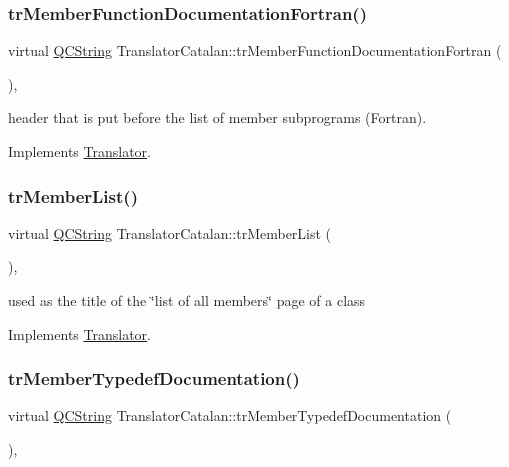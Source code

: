 \subsubsection{\texorpdfstring{trMemberFunctionDocumentationFortran()}{trMemberFunctionDocumentationFortran()}}
{\footnotesize\ttfamily virtual \mbox{\hyperlink{class_q_c_string}{Q\+C\+String}} Translator\+Catalan\+::tr\+Member\+Function\+Documentation\+Fortran (\begin{DoxyParamCaption}{ }\end{DoxyParamCaption})\hspace{0.3cm}{\ttfamily [inline]}, {\ttfamily [virtual]}}

header that is put before the list of member subprograms (Fortran). 

Implements \mbox{\hyperlink{class_translator}{Translator}}.

\mbox{\label{class_translator_catalan_a4f8c7c640d67b7a48c5c8532fb3a5a3e}} 
\subsubsection{\texorpdfstring{trMemberList()}{trMemberList()}}
{\footnotesize\ttfamily virtual \mbox{\hyperlink{class_q_c_string}{Q\+C\+String}} Translator\+Catalan\+::tr\+Member\+List (\begin{DoxyParamCaption}{ }\end{DoxyParamCaption})\hspace{0.3cm}{\ttfamily [inline]}, {\ttfamily [virtual]}}

used as the title of the \char`\"{}list of all members\char`\"{} page of a class 

Implements \mbox{\hyperlink{class_translator}{Translator}}.

\mbox{\label{class_translator_catalan_ac9ec506448770716a94c3a623ce82209}} 
\subsubsection{\texorpdfstring{trMemberTypedefDocumentation()}{trMemberTypedefDocumentation()}}
{\footnotesize\ttfamily virtual \mbox{\hyperlink{class_q_c_string}{Q\+C\+String}} Translator\+Catalan\+::tr\+Member\+Typedef\+Documentation (\begin{DoxyParamCaption}{ }\end{DoxyParamCaption})\hspace{0.3cm}{\ttfamily [inline]}, {\ttfamily [virtual]}}

